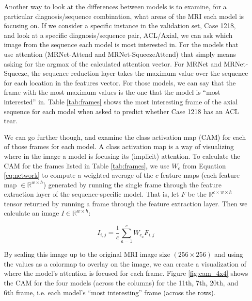 \documentclass[10pt,twocolumn,letterpaper]{article}
\begin{document}
Another way to look at the differences between models is to examine, for a particular diagnosis/sequence combination, what areas of the MRI each model is focusing on. If we consider a specific instance in the validation set, Case 1218, and look at a specific diagnosis/sequence pair, ACL/Axial, we can ask which image from the sequence each model is most interested in. For the models that use attention (MRNet-Attend and MRNet-SqueezeAttend) that simply means asking for the argmax of the calculated attention vector. For MRNet and MRNet-Squeeze, the sequence reduction layer takes the maximum value over the sequence for each location in the features vector. For those models, we can say that the frame with the most maximum values is the one that the model is ``most interested'' in. Table \ref{tab:frames} shows the most interesting frame of the axial sequence for each model when asked to predict whether Case 1218 has an ACL tear.

We can go further though, and examine the class activation map (CAM) for each of those frames for each model. A class activation map is a way of visualizing where in the image a model is focusing its (implicit) attention\cite{zhou2016learning}. To calculate the CAM for the frames listed in Table \ref{tab:frames}, we use $W_c$ from Equation \ref{eq:network} to compute a weighted average of the $c$ feature maps (each feature map $\in \mathbb{R}^{w \times h}$) generated by running the single frame through the feature extraction layer of the sequence-specific model. That is, let $F$ be the $\mathbb{R}^{c \times w \times h}$ tensor returned by running a frame through the feature extraction layer. Then we calculate an image $I \in \mathbb{R}^{w \times h}$:

$$I_{i,j} = \frac{1}{c} \sum_{a=1}^c W_{c_a} F_{i, j}$$

By scaling this image up to the original MRI image size $(256 \times 256)$ and using the values as a colormap to overlay on the image, we can create a visualization of where the model's attention is focused for each frame. Figure \ref{fig:cam_4x4} shows the CAM for the four models (across the columns) for the 11th, 7th, 20th, and 6th frame, i.e. each model's ``most interesting'' frame (across the rows).
\end{document}
